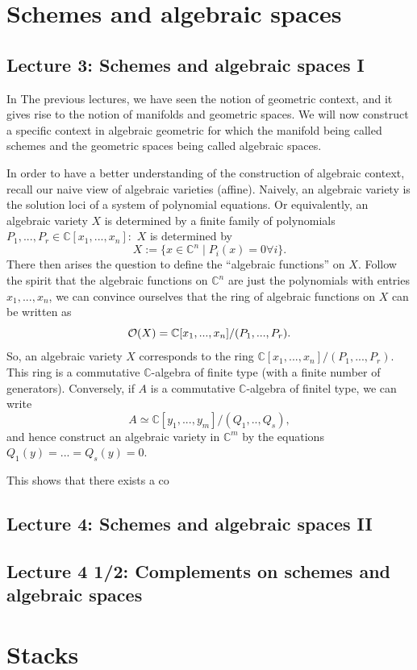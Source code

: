 \documentclass{tufte-book} %
\numberwithin{dummy}{section}
\newcommand{\cplx}{\mathbb C}
\newcommand{\calo}{{\cal O}}
\begin{document}
\chapter{Schemes and algebraic spaces}
\section{Lecture 3: Schemes and algebraic spaces I}
In The previous lectures, we have seen the notion of geometric context, and it gives rise to the notion of manifolds and geometric spaces. We will now construct a specific context in algebraic geometric for which the manifold being called schemes and the geometric spaces being called algebraic spaces.

In order to have a better understanding of the construction of algebraic context, recall our naive view of algebraic varieties (affine). Naively, an algebraic variety is the solution loci of a system of polynomial equations. Or equivalently, an algebraic variety $X$ is determined by a finite family of polynomials $P_1,...,P_r\in \cplx[x_1,...,x_n]:$ $X$ is determined by
$$
X:=\{x\in\cplx^n\mid P_i(x)=0\forall i\}.
$$ 
There then arises the question to define the ``algebraic functions'' on $X$. Follow the spirit that the algebraic functions on $\cplx^n$ are just the polynomials with entries $x_1,...,x_n$, we can convince ourselves that the ring of algebraic functions on  $X$ can be written as
$$
\calo(X)=\cplx[x_1,...,x_n]/(P_1,...,P_r).
$$  
So, an algebraic variety $X$ corresponds to the ring $\cplx[x_1,...,x_n]/(P_1,...,P_r)$. This ring is a commutative $\cplx$-algebra of finite type (with a finite number of generators). Conversely, if $A$ is a commutative $\cplx$-algebra  of finitel type, we can write
$$
A\simeq \cplx[y_1,...,y_m]/(Q_1,..,Q_s),
$$
and hence construct an algebraic variety in $\cplx^m$ by the equations $Q_1(y)=...=Q_s(y)=0$.

This shows that there exists a co 
\section{Lecture 4: Schemes and algebraic spaces II}
\section{Lecture 4 1/2: Complements on schemes and algebraic spaces}
\chapter{Stacks}
\end{document}
